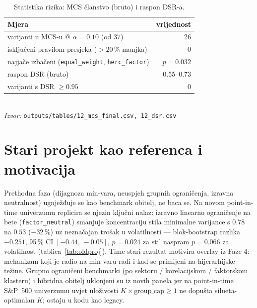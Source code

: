 \documentclass[11pt]{article}
\newcommand{\izvor}[1]{{\footnotesize\textit{Izvor:} \texttt{#1}}}
\begin{document}
\begin{table}[!htbp]
  \centering
  \caption{Statistika rizika: MCS članstvo (bruto) i raspon DSR-a.}
  \label{tab:mcsdsr}
  \small
  \begin{tabular}{lr}
    \toprule
    Mjera & vrijednost \\
    \midrule
    varijanti u MCS-u @ $\alpha{=}0.10$ (od 37)   & 26 \\
    isključeni pravilom presjeka ($>20\,\%$ manjka) & 0 \\
    najjače izbačeni (\texttt{equal\_weight}, \texttt{herc\_factor}) & $p=0.032$ \\
    raspon DSR (bruto)                            & 0.55--0.73 \\
    varijanti s DSR $\ge 0.95$                     & 0 \\
    \bottomrule
  \end{tabular}\\[0.3em]
  \izvor{outputs/tables/12\_mcs\_final.csv, 12\_dsr.csv}
\end{table}
\FloatBarrier

\section{Stari projekt kao referenca i motivacija}

Prethodna faza (dijagnoza min-vara, neuspjeh grupnih ograničenja, izravna
neutralnost) ugnježđuje se kao benchmark obitelj, ne baca se. Na novom
point-in-time univerzumu replicira se njezin ključni nalaz: izravno linearno
ograničenje na bete (\texttt{factor\_neutral}) smanjuje koncentraciju stila
minimalne varijance s $0.78$ na $0.53$ ($-32\,\%$) uz neznačajan trošak u
volatilnosti --- blok-bootstrap razlika $-0.251$, 95\,\% CI $[-0.44,\,-0.05]$,
$p=0.024$ za stil naspram $p=0.066$ za volatilnost (tablica~\ref{tab:oldproj}).
Time stari rezultat motivira overlay iz Faze 4: mehanizam koji je radio na
min-varu radi i kad se primijeni na hijerarhijske težine. Grupno ograničeni
benchmarki (po sektoru / korelacijskom / faktorskom klasteru) i hibridna obitelj
uklonjeni su iz novih panela jer na point-in-time S\&P~500 univerzumu uvjet
uloživosti $K\times\text{group\_cap}\ge 1$ ne dopušta silueta-optimalan $K$;
ostaju u kodu kao legacy.
\end{document}
